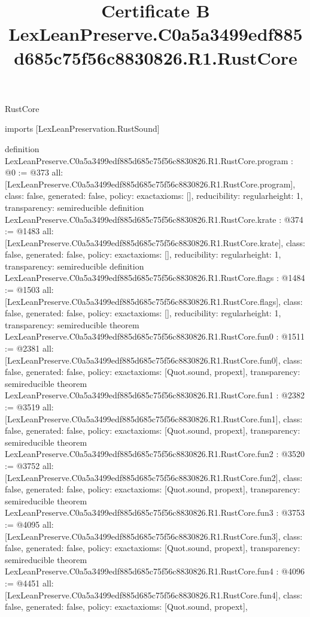 \begin{lexlean}{RustCore}
\title{Certificate B LexLeanPreserve.C0a5a3499edf885d685c75f56c8830826.R1.RustCore}
\begin{coremodule}
imports [LexLeanPreservation.RustSound]

definition LexLeanPreserve.C0a5a3499edf885d685c75f56c8830826.R1.RustCore.program : @0 := @373 {
  all: [LexLeanPreserve.C0a5a3499edf885d685c75f56c8830826.R1.RustCore.program],
  class: false,
  generated: false,
  policy: exact{axioms: []},
  reducibility: regular{height: 1},
  transparency: semireducible
}
definition LexLeanPreserve.C0a5a3499edf885d685c75f56c8830826.R1.RustCore.krate : @374 := @1483 {
  all: [LexLeanPreserve.C0a5a3499edf885d685c75f56c8830826.R1.RustCore.krate],
  class: false,
  generated: false,
  policy: exact{axioms: []},
  reducibility: regular{height: 1},
  transparency: semireducible
}
definition LexLeanPreserve.C0a5a3499edf885d685c75f56c8830826.R1.RustCore.flags : @1484 := @1503 {
  all: [LexLeanPreserve.C0a5a3499edf885d685c75f56c8830826.R1.RustCore.flags],
  class: false,
  generated: false,
  policy: exact{axioms: []},
  reducibility: regular{height: 1},
  transparency: semireducible
}
theorem LexLeanPreserve.C0a5a3499edf885d685c75f56c8830826.R1.RustCore.fun0 : @1511 := @2381 {
  all: [LexLeanPreserve.C0a5a3499edf885d685c75f56c8830826.R1.RustCore.fun0],
  class: false,
  generated: false,
  policy: exact{axioms: [Quot.sound, propext]},
  transparency: semireducible
}
theorem LexLeanPreserve.C0a5a3499edf885d685c75f56c8830826.R1.RustCore.fun1 : @2382 := @3519 {
  all: [LexLeanPreserve.C0a5a3499edf885d685c75f56c8830826.R1.RustCore.fun1],
  class: false,
  generated: false,
  policy: exact{axioms: [Quot.sound, propext]},
  transparency: semireducible
}
theorem LexLeanPreserve.C0a5a3499edf885d685c75f56c8830826.R1.RustCore.fun2 : @3520 := @3752 {
  all: [LexLeanPreserve.C0a5a3499edf885d685c75f56c8830826.R1.RustCore.fun2],
  class: false,
  generated: false,
  policy: exact{axioms: [Quot.sound, propext]},
  transparency: semireducible
}
theorem LexLeanPreserve.C0a5a3499edf885d685c75f56c8830826.R1.RustCore.fun3 : @3753 := @4095 {
  all: [LexLeanPreserve.C0a5a3499edf885d685c75f56c8830826.R1.RustCore.fun3],
  class: false,
  generated: false,
  policy: exact{axioms: [Quot.sound, propext]},
  transparency: semireducible
}
theorem LexLeanPreserve.C0a5a3499edf885d685c75f56c8830826.R1.RustCore.fun4 : @4096 := @4451 {
  all: [LexLeanPreserve.C0a5a3499edf885d685c75f56c8830826.R1.RustCore.fun4],
  class: false,
  generated: false,
  policy: exact{axioms: [Quot.sound, propext]},
}
\end{coremodule}
\end{lexlean}
